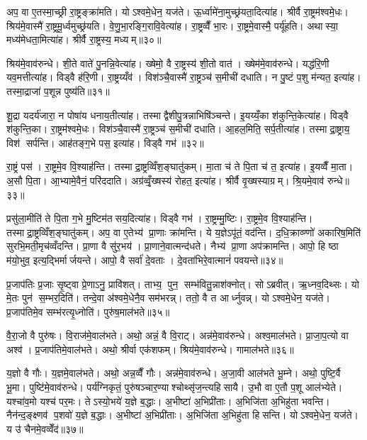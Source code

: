 अप॒ वा ए॒तस्मा॒च्छ्री रा॒ष्ट्रङ्क्रा॑मति। योऽश्वमे॒धेन॒ यज॑ते। ऊ॒र्ध्वामे॑ना॒मुच्छ्र॑यता॒दित्या॑ह। श्रीर्वै रा॒ष्ट्रम॑श्वमे॒धः। श्रिय॑मे॒वास्मै॑ रा॒ष्ट्रमू॒र्ध्वमुच्छ्र॑यति। वे॒णु॒भा॒रङ्गि॒रावि॒वेत्या॑ह। रा॒ष्ट्रव्वैँ भा॒रः। रा॒ष्ट्रमे॒वास्मै॒ पर्यू॑हति। अथास्या॒ मध्य॑मेधता॒मित्या॑ह। श्रीर्वै रा॒ष्ट्रस्य॒ मध्यम्॥३०॥

श्रिय॑मे॒वाव॑रुन्धे। शी॒ते वाते॑ पु॒नन्नि॒वेत्या॑ह। ख्षेमो॒ वै रा॒ष्ट्रस्य॑ शी॒तो वात॑। ख्षेम॑मे॒वाव॑रुन्धे। यद्ध॑रि॒णी यव॒मत्तीत्या॑ह। विड्वै ह॑रि॒णी। रा॒ष्ट्रय्यँव॑। विश॑ञ्चै॒वास्मै॑ रा॒ष्ट्रञ्च॑ स॒मीची॑ दधाति। न पु॒ष्टं प॒शु म॑न्यत॒ इत्या॑ह। तस्मा॒द्राजा॑ प॒शून्न पुष्य॑ति॥३१॥

शू॒द्रा यदर्य॑जारा॒ न पोषा॑य धनाय॒तीत्या॑ह। तस्माद्वैशीपु॒त्रन्नाभिषि॑ञ्चन्ते। इ॒यय्यँ॒का श॑कुन्ति॒केत्या॑ह। विड्वै श॑कुन्ति॒का। रा॒ष्ट्रम॑श्वमे॒धः। विश॑ञ्चै॒वास्मै॑ रा॒ष्ट्रञ्च॑ स॒मीची॑ दधाति। आ॒हल॒मिति॒ सर्प॒तीत्या॑ह। तस्माद्रा॒ष्ट्राय॒ विश॑ सर्पन्ति। आह॑तङ्ग॒भे पस॒ इत्या॑ह। विड्वै गभ॑॥३२॥

रा॒ष्ट्रं पस॑। रा॒ष्ट्रमे॒व वि॒श्याह॑न्ति। तस्माद्रा॒ष्ट्रव्विँश॒ङ्घातु॑कम्। मा॒ता च॑ ते पि॒ता च॑ त॒ इत्या॑ह। इ॒यव्वैँ मा॒ता। अ॒सौ पि॒ता। आ॒भ्यामे॒वैनं॒ परि॑ददाति। अग्र॑व्वृँ॒ख्षस्य॑ रोहत॒ इत्या॑ह। श्रीर्वै वृ॒ख्षस्याग्रम्। श्रि॒यमे॒वाव॑ रुन्धे॥३३॥

प्रसु॑ला॒मीति॑ ते पि॒ता ग॒भे मु॒ष्टिम॑तसय॒दित्या॑ह। विड्वै गभ॑। रा॒ष्ट्रम्मु॒ष्टिः। रा॒ष्ट्रमे॒व वि॒श्याह॑न्ति। तस्माद्रा॒ष्ट्रव्विँश॒ङ्घातु॑कम्। अप॒ वा ए॒तेभ्य॑ प्रा॒णाः क्रा॑मन्ति। ये य॒ज्ञेऽपू॑तं॒ वद॑न्ति। द॒धि॒क्राव्ण्णो॑ अकारिष॒मिति॑ सुरभि॒मती॒मृच॑व्वँदन्ति। प्रा॒णा वै सु॑र॒भय॑। प्रा॒णाने॒वात्मन्द॑धते। नैभ्य॑ प्रा॒णा अप॑क्रामन्ति। आपो॒ हि ष्ठा म॑यो॒भुव॒ इत्य॒द्भिर्मार्जयन्ते। आपो॒ वै सर्वा॑ दे॒वताः। दे॒वता॑भिरे॒वात्मानं॑ पवयन्ते॥३४॥\anuvakamend[रा॒ष्ट्रस्य॒ मध्यं॒ पुष्य॑ति॒ गभो॑ रुन्धे दधते च॒त्वारि॑ च]

प्र॒जाप॑तिः प्र॒जाः सृ॒ष्ट्वा प्रे॒णाऽनु॒ प्रावि॑शत्। ताभ्य॒ पुन॒ सम्भ॑वितु॒न्नाश॑क्नोत्। सोऽब्रवीत्। ऋ॒ध्नव॒दिथ्सः। यो मे॒तः पुन॑ स॒म्भर॒दिति॑। तन्दे॒वा अ॑श्वमे॒धेनै॒व सम॑भरन्न्। ततो॒ वै त आर्ध्नुवन्न्। योऽश्वमे॒धेन॒ यज॑ते। प्र॒जाप॑तिमे॒व सम्भ॑रत्यृ॒ध्नोति॑। पुरु॑ष॒माल॑भते॥३५॥

वै॒रा॒जो वै पुरु॑षः। वि॒राज॑मे॒वाल॑भते। अथो॒ अन्नं॒ वै वि॒राट्। अन्न॑मे॒वाव॑रुन्धे। अश्व॒माल॑भते। प्रा॒जा॒प॒त्यो वा अश्व॑। प्र॒जाप॑तिमे॒वाल॑भते। अथो॒ श्रीर्वा एक॑शफम्। श्रिय॑मे॒वाव॑रुन्धे। गामाल॑भते॥३६॥

य॒ज्ञो वै गौः। य॒ज्ञमे॒वाल॑भते। अथो॒ अन्न॒व्वैँ गौः। अन्न॑मे॒वाव॑रुन्धे। अ॒जा॒वी आल॑भते भू॒म्ने। अथो॒ पुष्टि॒र्वै भू॒मा। पुष्टि॑मे॒वाव॑रुन्धे। पर्य॑ग्निकृतं॒ पुरु॑षञ्चार॒ण्याश्चोथ्सृ॑ज॒न्त्यहिसायै। उ॒भौ वा ए॒तौ प॒शू आल॑भ्येते। यश्चा॑व॒मो यश्च॑ पर॒मः। तेऽस्यो॒भये॑ य॒ज्ञे ब॒द्धाः। अ॒भीष्टा॑ अ॒भिप्री॑ताः। अ॒भिजि॑ता अ॒भिहु॑ता भवन्ति। नैन॑न्द॒ङ्क्ष्णव॑ प॒शवो॑ य॒ज्ञे ब॒द्धाः। अ॒भीष्टा॑ अ॒भिप्री॑ताः। अ॒भिजि॑ता अ॒भिहु॑ता हिसन्ति। योऽश्वमे॒धेन॒ यज॑ते। य उ॑ चैनमे॒वव्वेँद॑॥३७॥\anuvakamend[ल॒भ॒ते॒ गामाल॑भते पर॒मोऽष्टौ च॑]

